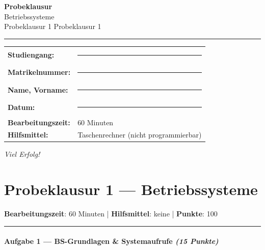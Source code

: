\documentclass[11pt, a4paper]{article}
\providecommand{\nichttitle}{Probeklausur}
\providecommand{\nichtsubtitle}{}
\renewcommand{\nichttitle}{Betriebssysteme}
\renewcommand{\nichtsubtitle}{Probeklausur 1}
\begin{document}
\thispagestyle{empty}
\begin{center}
\vspace*{1cm}
{\Huge\bfseries\color{accent}Probeklausur}\\[8pt]
{\Large\color{accent}\nichttitle}\\[4pt]
\ifx\nichtsubtitle\empty\else
  {\large\color{accent!80!black}\nichtsubtitle}\\[6pt]
\fi
\color{accent}\rule{0.5\linewidth}{1pt}\color{black}
\end{center}

\vspace{1cm}
\begin{tabularx}{\textwidth}{@{}l X@{}}
\textbf{Studiengang:}      & \rule{6cm}{0.4pt} \\[6pt]
\textbf{Matrikelnummer:}    & \rule{6cm}{0.4pt} \\[6pt]
\textbf{Name, Vorname:}    & \rule{6cm}{0.4pt} \\[6pt]
\textbf{Datum:}             & \rule{6cm}{0.4pt} \\[6pt]
\textbf{Bearbeitungszeit:}  & 60 Minuten \\[6pt]
\textbf{Hilfsmittel:}       & Taschenrechner (nicht programmierbar) \\
\end{tabularx}

\vspace{2cm}
\begin{center}
{\large\itshape Viel Erfolg!}
\end{center}

\newpage


\section{Probeklausur 1 — Betriebssysteme}

\textbf{Bearbeitungszeit}: 60 Minuten | \textbf{Hilfsmittel}: keine | \textbf{Punkte}: 100



\noindent\textcolor{rulegray}{\rule{\linewidth}{0.4pt}}


\paragraph{Aufgabe 1 — BS-Grundlagen \& Systemaufrufe \textit{(15 Punkte)}}\mbox{}\\[2pt]
\end{document}
